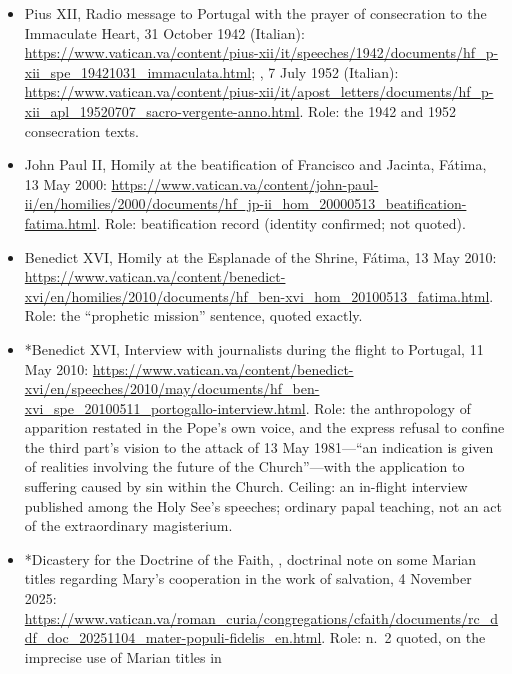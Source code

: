 \begin{itemize}
{Mary}, 25 March 2022:
\url{https://www.vatican.va/content/francesco/en/prayers/documents/20220325-atto-consacrazione-cuoredimaria.html};
with the Letter to the Bishops, 21 March 2022:
\url{https://www.vatican.va/content/francesco/en/letters/2022/documents/20220321-lettera-consacrazione-cuoredimaria.html}.
Role: the 2022 act's text (Russia and Ukraine named) and its
self-description.
\item Pius XII, Radio message to Portugal with the prayer of
consecration to the Immaculate Heart, 31 October 1942 (Italian):
\url{https://www.vatican.va/content/pius-xii/it/speeches/1942/documents/hf_p-xii_spe_19421031_immaculata.html};
, 7 July 1952 (Italian):
\url{https://www.vatican.va/content/pius-xii/it/apost_letters/documents/hf_p-xii_apl_19520707_sacro-vergente-anno.html}.
Role: the 1942 and 1952 consecration texts.
\item John Paul II, Homily at the beatification of Francisco and
Jacinta, F\'atima, 13 May 2000:
\url{https://www.vatican.va/content/john-paul-ii/en/homilies/2000/documents/hf_jp-ii_hom_20000513_beatification-fatima.html}.
Role: beatification record (identity confirmed; not quoted).
\item Benedict XVI, Homily at the Esplanade of the Shrine, F\'atima,
13 May 2010:
\url{https://www.vatican.va/content/benedict-xvi/en/homilies/2010/documents/hf_ben-xvi_hom_20100513_fatima.html}.
Role: the ``prophetic mission'' sentence, quoted exactly.
\item *Benedict XVI, Interview with journalists during the flight to
Portugal, 11 May 2010:
\url{https://www.vatican.va/content/benedict-xvi/en/speeches/2010/may/documents/hf_ben-xvi_spe_20100511_portogallo-interview.html}.
Role: the anthropology of apparition restated in the Pope's own
voice, and the express refusal to confine the third part's vision to
the attack of 13 May 1981---``an indication is given of realities
involving the future of the Church''---with the application to
suffering caused by sin within the Church. Ceiling: an in-flight
interview published among the Holy See's speeches; ordinary papal
teaching, not an act of the extraordinary magisterium.
\item *Dicastery for the Doctrine of the Faith, , doctrinal note on some Marian titles regarding Mary's
cooperation in the work of salvation, 4 November 2025:
\url{https://www.vatican.va/roman_curia/congregations/cfaith/documents/rc_ddf_doc_20251104_mater-populi-fidelis_en.html}.
Role: n.~2 quoted, on the imprecise use of Marian titles in

\end{itemize}
